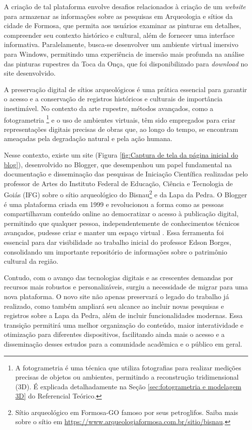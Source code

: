 A criação de tal plataforma envolve desafios relacionados à criação de um \textit{website} para armazenar as informações sobre as pesquisas em Arqueologia e sítios da cidade de Formosa, que permita aos usuários examinar as pinturas em detalhes, compreender seu contexto histórico e cultural, além de fornecer uma interface informativa. Paralelamente, busca-se desenvolver um ambiente virtual imersivo para Windows, permitindo uma experiência de imersão mais profunda na análise das pinturas rupestres da Toca da Onça, que foi disponibilizado para \textit{download} no site desenvolvido. 

A preservação digital de sítios arqueológicos é uma prática essencial para garantir o acesso e a conservação de registros históricos e culturais de importância inestimável. No contexto da arte rupestre, métodos avançados, como a fotogrametria \footnote{A fotogrametria é uma técnica que utiliza fotografias para realizar medições precisas de objetos ou ambientes, permitindo a reconstrução tridimensional (3D). É explicada detalhadamente na Seção \ref{sec:fotogrametria e modelagem 3D} do Referencial Teórico.} e o uso de ambientes virtuais, têm sido empregados para criar representações digitais precisas de obras que, ao longo do tempo, se encontram ameaçadas pela degradação natural e pela ação humana.

Nesse contexto, existe um site (Figura \ref{fig:Captura de tela da página inicial do blog}), desenvolvido no Blogger, que desempenhou um papel fundamental na documentação e disseminação das pesquisas de Iniciação Científica realizadas pelo professor de Artes do Instituto Federal de Educação, Ciência e Tecnologia de Goiás (IFG) sobre o sítio arqueológico do Bisnau\footnote{Sítio arqueológico em Formosa-GO famoso por seus petroglifos. Saiba mais sobre o sítio em \url{https://www.arqueologiaformosa.com.br/sitio/bisnau}.} e da Lapa da Pedra. O Blogger é uma plataforma criada em 1999 e revolucionou a forma como as pessoas compartilhavam conteúdo online ao democratizar o acesso à publicação digital, permitindo que qualquer pessoa, independentemente de conhecimentos técnicos avançados, pudesse criar e manter um espaço virtual \citep{BALLARD2012105}. Essa ferramenta foi essencial para dar visibilidade ao trabalho inicial do professor Edson Borges, consolidando um importante repositório de informações sobre o patrimônio cultural da região.

Contudo, com o avanço das tecnologias digitais e as crescentes demandas por recursos mais robustos e personalizáveis, surgiu a necessidade de migrar para uma nova plataforma. O novo site não apenas preservará o legado do trabalho já realizado, como também ampliará seu alcance ao incluir novas pesquisas e registros sobre a Lapa da Pedra, além de incluir funcionalidades modernas. Essa transição permitirá uma melhor organização do conteúdo, maior interatividade e otimização para diferentes dispositivos, facilitando ainda mais o acesso e a disseminação desses estudos para a comunidade acadêmica e o público em geral.

